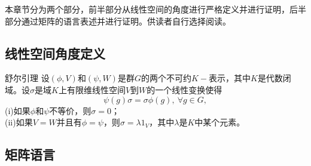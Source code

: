 
\begin{issues}
\issueDraft
\issueNeedCite
\issueTODO
\issueMissDepend
\end{issues}


本章节分为两个部分，前半部分从线性空间的角度进行严格定义并进行证明，后半部分通过矩阵的语言表述并进行证明。供读者自行选择阅读。

\subsection{线性空间角度定义}


\begin{lemma}{舒尔引理}
设$(\phi,V)$和$(\psi,W)$是群$G$的两个不可约$K-$表示，其中$K$是代数闭域。设$\sigma$是域$K$上有限维线性空间$V$到$W$的一个线性变换使得
\begin{equation}\label{eq_Schlem_1}
\psi(g)\sigma =\sigma \phi(g),~\forall g \in G,
\end{equation}
(i)如果$\phi$和$\psi$不等价，则$\sigma=0$； \\
(ii)如果$V=W$并且有$\phi=\psi$，则$\sigma=\lambda1_V$，其中$\lambda$是$K$中某个元素。
\end{lemma}







\subsection{矩阵语言}

